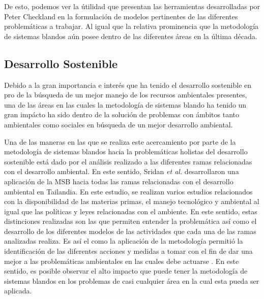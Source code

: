 \documentclass[10pt,letterpaper,twoside,twocolumn]{article}   %
\begin{document}
De esto, podemos ver la útilidad que presentan las herramientas desarrolladas por Peter Checkland en la formulación de modelos pertinentes de las diferentes problemáticas a trabajar. Al igual que la relativa prominencia que la metodología de sistemas blandos aún posee dentro de las diferentes áreas en la última década.

\subsection{Desarrollo Sostenible}
Debido a la gran importancia e interés que ha tenido el desarrollo sostenible en pro de la búsqueda de un mejor manejo de los recursos ambientales presentes, una de las áreas en las cuales la metodología de sistemas blando ha tenido un gran impácto ha sido dentro de la solución de problemas con ámbitos tanto ambientales como sociales en búsqueda de un mejor desarrollo ambiental.

Una de las maneras en las que se realiza este acercamiento por parte de la metodología de sistemas blandos hacia la problemáticas holistas del desarrollo sostenible está dado por el análisis realizado a las diferentes ramas relacionadas con el desarrollo ambiental. En este sentido, Sridan \textit{et al.} desarrollaron una aplicación de la MSB hacia todas las ramas relacionadas con el desarrollo ambiental en Tailandia. En este estudio, se realizan varios estudios relacionados con la disponibilidad de las materias primas, el manejo tecnológico y ambiental al igual que las políticas y leyes relacionadas con el ambiente. En este sentido, estas distinciones realizadas son las que permiten entender la problemática así como el desarrollo de los diferentes modelos de las actividades que cada una de las ramas analizadas realiza. Es así el como la aplicación de la metodología permitió la identificación de las diferentes acciones y medidas a tomar con el fin de dar una mejor a las problemáticas ambientales en las cuales debe actuarse \cite{Sridan[1]}. En este sentido, es posible observar el alto impacto que puede tener la metodología de sistemas blandos en los problemas de casi cualquier área en la cual esta pueda ser aplicada. 
\end{document}
